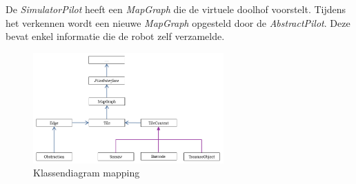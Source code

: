 \documentclass[eind]{penoverslag}
\begin{document}
De \textit{SimulatorPilot} heeft een \textit{MapGraph} die de virtuele doolhof voorstelt. Tijdens het verkennen wordt een nieuwe \textit{MapGraph} opgesteld door de \textit{AbstractPilot}. Deze bevat enkel informatie die de robot zelf verzamelde.


\begin{figure}[h!]
\centering
	\includegraphics[width=0.65\textwidth]{klasMapping}
\caption{Klassendiagram mapping}
\label{fig:klasMap}
\end{figure}


\end{document}

